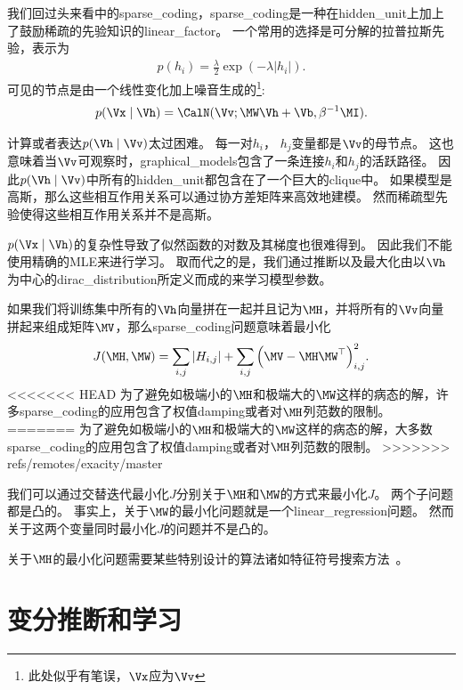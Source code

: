 我们回过头来看中的\gls{sparse_coding}，\gls{sparse_coding}是一种在\gls{hidden_unit}上加上了鼓励稀疏的先验知识的\gls{linear_factor}。
一个常用的选择是可分解的拉普拉斯先验，表示为
\begin{align}
	p(h_i) = \frac{\lambda}{2}  \exp(-\lambda \vert h_i \vert).
\end{align}
可见的节点是由一个线性变化加上噪音生成的\footnote{此处似乎有笔误，$\Vx$应为$\Vv$}:
\begin{align}
p(\Vx\mid\Vh) = \CalN(\Vv;{\MW}\Vh + \Vb,\beta^{-1}{\MI}).
\end{align}




计算或者表达$p(\Vh\mid\Vv)$太过困难。
每一对$h_i$， $h_j$变量都是$\Vv$的母节点。
这也意味着当$\Vv$可观察时，\gls{graphical_models}包含了一条连接$h_i$和$h_j$的活跃路径。
因此$p(\Vh \mid\Vv)$中所有的\gls{hidden_unit}都包含在了一个巨大的\gls{clique}中。
如果模型是高斯，那么这些相互作用关系可以通过协方差矩阵来高效地建模。
然而稀疏型先验使得这些相互作用关系并不是高斯。



$p(\Vx\mid\Vh)$的复杂性导致了似然函数的对数及其梯度也很难得到。
因此我们不能使用精确的\gls{MLE}来进行学习。
取而代之的是，我们通过推断以及最大化由以$\Vh$为中心的\gls{dirac_distribution}所定义而成的来学习模型参数。


如果我们将训练集中所有的$\Vh$向量拼在一起并且记为$\MH$，并将所有的$\Vv$向量拼起来组成矩阵$\MV$，那么\gls{sparse_coding}问题意味着最小化
\begin{align}
	J(\MH,\MW) = \sum_{i,j}^{}\vert H_{i,j}\vert + \sum_{i,j}^{}\Big(\MV - \MH \MW^{\top}\Big)^2_{i,j}.
\end{align}
<<<<<<< HEAD
为了避免如极端小的$\MH$和极端大的$\MW$这样的病态的解，许多\gls{sparse_coding}的应用包含了权值\gls{damping}或者对$\MH$列范数的限制。
=======
为了避免如极端小的$\MH$和极端大的$\MW$这样的病态的解，大多数\gls{sparse_coding}的应用包含了权值\gls{damping}或者对$\MH$列范数的限制。
>>>>>>> refs/remotes/exacity/master


我们可以通过交替迭代最小化$J$分别关于$\MH$和$\MW$的方式来最小化$J$。
两个子问题都是凸的。
事实上，关于$\MW$的最小化问题就是一个\gls{linear_regression}问题。
然而关于这两个变量同时最小化$J$的问题并不是凸的。


关于$\MH$的最小化问题需要某些特别设计的算法诸如特征符号搜索方法~\citep{HonglakLee-2007}。


\section{变分推断和学习}
\label{sec:variational_inference_and_learning}


